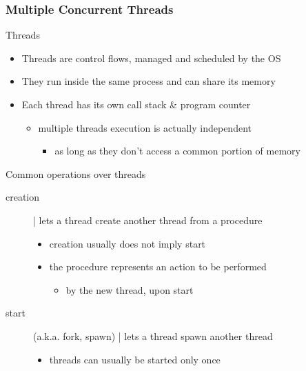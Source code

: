 \documentclass{beamer}\mode<presentation>{\usetheme{AMSBolognaFC}}
\begin{document}
\begin{frame}[allowframebreaks]
    \frametitle{Multiple Concurrent Threads}

    \begin{block}{Threads}
        \begin{itemize}
            \item Threads are control flows, managed and scheduled by the OS
            \item They run inside the same process and can share its memory
            \item Each thread has its own call stack \& program counter
            \begin{itemize}
                \item multiple threads execution is actually independent
                \begin{itemize}
                    \item as long as they don't access a common portion of memory
                \end{itemize}
            \end{itemize}
        \end{itemize}
    \end{block}

    \begin{exampleblock}{Common operations over threads}
        \begin{description}
            \item[creation] | lets a thread create another thread from a \alert{procedure}
            \begin{itemize}
                \item creation usually does not imply start
                \item the procedure represents an action to be performed
                \begin{itemize}
                    \item by the new thread, upon start
                \end{itemize}
            \end{itemize}

            \item[start] (a.k.a. fork, spawn) | lets a thread spawn another thread
            \begin{itemize}
                \item threads can usually be started only once
            \end{itemize}


\end{description}
\end{exampleblock}
\end{frame}
\end{document}
